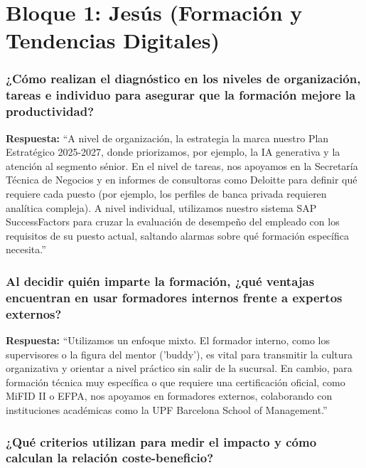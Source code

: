 \section{Bloque 1: Jesús (Formación y Tendencias Digitales)}

\subsubsection*{¿Cómo realizan el diagnóstico en los niveles de organización, tareas e individuo para asegurar que la formación mejore la productividad?}

\textbf{Respuesta:}\newline
``A nivel de organización, la estrategia la marca nuestro Plan Estratégico 2025-2027, donde priorizamos, por ejemplo, la IA generativa y la atención al segmento sénior. En el nivel de tareas, nos apoyamos en la Secretaría Técnica de Negocios y en informes de consultoras como Deloitte para definir qué requiere cada puesto (por ejemplo, los perfiles de banca privada requieren analítica compleja). A nivel individual, utilizamos nuestro sistema SAP SuccessFactors para cruzar la evaluación de desempeño del empleado con los requisitos de su puesto actual, saltando alarmas sobre qué formación específica necesita.''

\subsubsection*{Al decidir quién imparte la formación, ¿qué ventajas encuentran en usar formadores internos frente a expertos externos?}

\textbf{Respuesta:}\newline
``Utilizamos un enfoque mixto. El formador interno, como los supervisores o la figura del mentor ('buddy'), es vital para transmitir la cultura organizativa y orientar a nivel práctico sin salir de la sucursal. En cambio, para formación técnica muy específica o que requiere una certificación oficial, como MiFID II o EFPA, nos apoyamos en formadores externos, colaborando con instituciones académicas como la UPF Barcelona School of Management.''

\subsubsection*{¿Qué criterios utilizan para medir el impacto y cómo calculan la relación coste-beneficio?}

